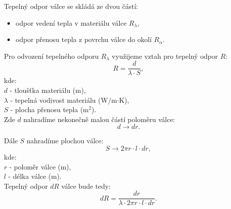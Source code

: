 \documentclass{article}
\begin{document}
\begin{center}
\end{center}

Tepelný odpor válce se skládá ze dvou částí:
\begin{itemize}
    \item odpor vedení tepla v materiálu válce $R_{\lambda}$,
    \item odpor přenosu tepla z povrchu válce do okolí $R_{\alpha}$.
\end{itemize}

Pro odvození tepelného odporu $R_{\lambda}$ využijeme vztah pro tepelný odpor $R$:
$$
    R = \frac{d}{\lambda \cdot S},
$$
kde:\\
$d$ - tloušťka materiálu (m),\\
$\lambda$ - tepelná vodivost materiálu (W/m$\cdot$K),\\
$S$ - plocha přenosu tepla (m$^2$).\\

Zde $d$ nahradíme nekonečně malou částí poloměru válce:
$$
    d \rightarrow dr.
$$

Dále $S$ nahradíme plochou válce:
$$
    S \rightarrow 2 \pi r \cdot l \cdot dr,
$$
kde:\\
$r$ - poloměr válce (m),\\
$l$ - délka válce (m).\\

Tepelný odpor $dR$ válce bude tedy:
$$
    dR = \frac{dr}{\lambda \cdot 2 \pi r \cdot l \cdot dr}.
$$
\end{document}
